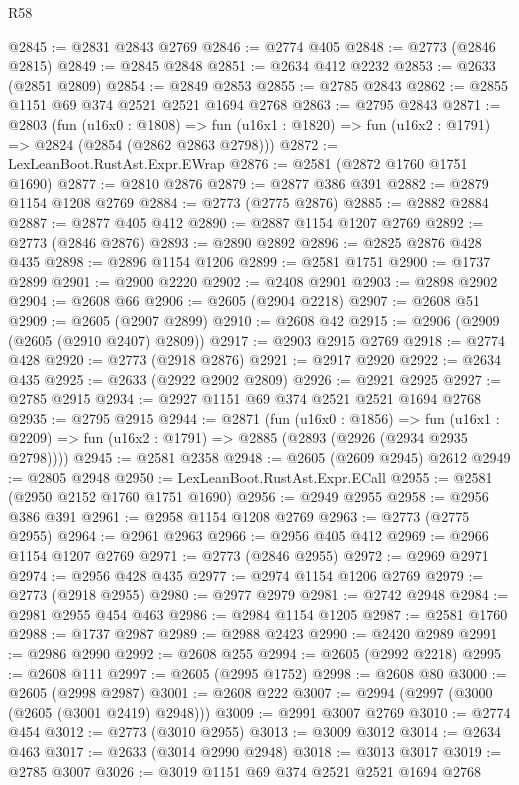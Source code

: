 \begin{lexlean}{R58}
\begin{coremodule}
@2845 := @2831 @2843 @2769
@2846 := @2774 @405
@2848 := @2773 (@2846 @2815)
@2849 := @2845 @2848
@2851 := @2634 @412 @2232
@2853 := @2633 (@2851 @2809)
@2854 := @2849 @2853
@2855 := @2785 @2843
@2862 := @2855 @1151 @69 @374 @2521 @2521 @1694 @2768
@2863 := @2795 @2843
@2871 := @2803
    (fun (u16x0 : @1808) =>
    fun (u16x1 : @1820) => fun (u16x2 : @1791) => @2824 (@2854 (@2862 @2863 @2798)))
@2872 := LexLeanBoot.RustAst.Expr.EWrap
@2876 := @2581 (@2872 @1760 @1751 @1690)
@2877 := @2810 @2876
@2879 := @2877 @386 @391
@2882 := @2879 @1154 @1208 @2769
@2884 := @2773 (@2775 @2876)
@2885 := @2882 @2884
@2887 := @2877 @405 @412
@2890 := @2887 @1154 @1207 @2769
@2892 := @2773 (@2846 @2876)
@2893 := @2890 @2892
@2896 := @2825 @2876 @428 @435
@2898 := @2896 @1154 @1206
@2899 := @2581 @1751
@2900 := @1737 @2899
@2901 := @2900 @2220
@2902 := @2408 @2901
@2903 := @2898 @2902
@2904 := @2608 @66
@2906 := @2605 (@2904 @2218)
@2907 := @2608 @51
@2909 := @2605 (@2907 @2899)
@2910 := @2608 @42
@2915 := @2906 (@2909 (@2605 (@2910 @2407) @2809))
@2917 := @2903 @2915 @2769
@2918 := @2774 @428
@2920 := @2773 (@2918 @2876)
@2921 := @2917 @2920
@2922 := @2634 @435
@2925 := @2633 (@2922 @2902 @2809)
@2926 := @2921 @2925
@2927 := @2785 @2915
@2934 := @2927 @1151 @69 @374 @2521 @2521 @1694 @2768
@2935 := @2795 @2915
@2944 := @2871
    (fun (u16x0 : @1856) =>
    fun (u16x1 : @2209) => fun (u16x2 : @1791) => @2885 (@2893 (@2926 (@2934 @2935 @2798))))
@2945 := @2581 @2358
@2948 := @2605 (@2609 @2945) @2612
@2949 := @2805 @2948
@2950 := LexLeanBoot.RustAst.Expr.ECall
@2955 := @2581 (@2950 @2152 @1760 @1751 @1690)
@2956 := @2949 @2955
@2958 := @2956 @386 @391
@2961 := @2958 @1154 @1208 @2769
@2963 := @2773 (@2775 @2955)
@2964 := @2961 @2963
@2966 := @2956 @405 @412
@2969 := @2966 @1154 @1207 @2769
@2971 := @2773 (@2846 @2955)
@2972 := @2969 @2971
@2974 := @2956 @428 @435
@2977 := @2974 @1154 @1206 @2769
@2979 := @2773 (@2918 @2955)
@2980 := @2977 @2979
@2981 := @2742 @2948
@2984 := @2981 @2955 @454 @463
@2986 := @2984 @1154 @1205
@2987 := @2581 @1760
@2988 := @1737 @2987
@2989 := @2988 @2423
@2990 := @2420 @2989
@2991 := @2986 @2990
@2992 := @2608 @255
@2994 := @2605 (@2992 @2218)
@2995 := @2608 @111
@2997 := @2605 (@2995 @1752)
@2998 := @2608 @80
@3000 := @2605 (@2998 @2987)
@3001 := @2608 @222
@3007 := @2994 (@2997 (@3000 (@2605 (@3001 @2419) @2948)))
@3009 := @2991 @3007 @2769
@3010 := @2774 @454
@3012 := @2773 (@3010 @2955)
@3013 := @3009 @3012
@3014 := @2634 @463
@3017 := @2633 (@3014 @2990 @2948)
@3018 := @3013 @3017
@3019 := @2785 @3007
@3026 := @3019 @1151 @69 @374 @2521 @2521 @1694 @2768

\end{coremodule}
\end{lexlean}

